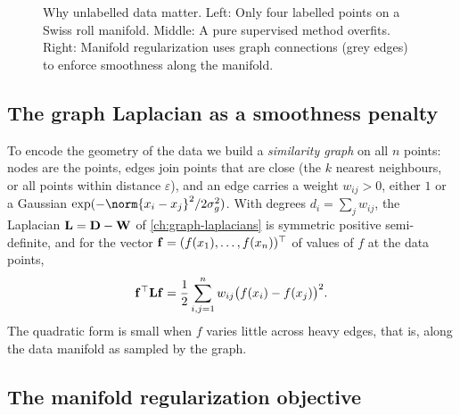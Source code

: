 \begin{notechapter}
\begin{figure}[ht]
\caption{Why unlabelled data matter. Left: Only four labelled
points on a Swiss roll manifold. Middle: A pure supervised
method overfits. Right: Manifold regularization uses graph
connections (grey edges) to enforce smoothness along the manifold.}
\label{rkhs:fig:manifold_motivation}
\end{figure}

\subsection{The graph Laplacian as a smoothness penalty}
\label{rkhs:subsec:graph_laplacian}

To encode the geometry of the data we build a \emph{similarity graph} on all $n$ points: nodes are the points, edges join points that are close (the $k$ nearest neighbours, or all points within distance $\varepsilon$), and an edge carries a weight $w_{ij} > 0$, either $1$ or a Gaussian $\exp(-\norm{x_i - x_j}^2/2\sigma_g^2)$. With degrees $d_i = \sum_j w_{ij}$, the Laplacian $\mathbf{L} = \mathbf{D} - \mathbf{W}$ of \cref{ch:graph-laplacians} is symmetric positive semi-definite, and for the vector $\mathbf{f} = (f(x_1), \ldots, f(x_n))^\top$ of values of $f$ at the data points,
\begin{equation}
\label{rkhs:eq:laplacian_quadratic}
\mathbf{f}^\top \mathbf{L} \mathbf{f} = \frac{1}{2} \sum_{i,j=1}^n w_{ij}\bigl(f(x_i) - f(x_j)\bigr)^2 .
\end{equation}
The quadratic form is small when $f$ varies little across heavy edges, that is, along the data manifold as sampled by the graph.

\subsection{The manifold regularization objective}
\label{rkhs:subsec:manifold_objective}


\end{notechapter}
